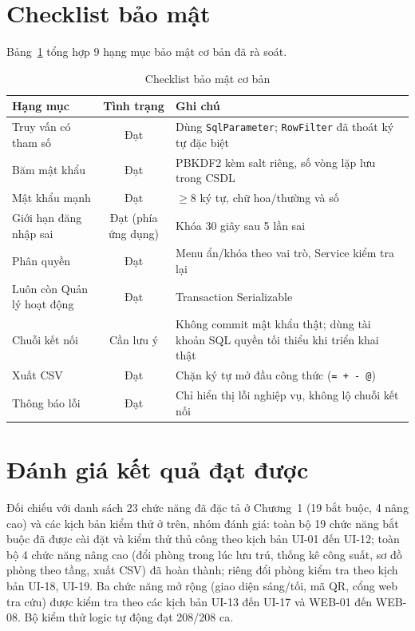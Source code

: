 \documentclass[14pt]{report}
\begin{document}
\section{Checklist bảo mật}

Bảng~\ref{tab:bmbd} tổng hợp 9 hạng mục bảo mật cơ bản đã rà soát.

\begin{table}[H]
\centering
\caption{Checklist bảo mật cơ bản}
\label{tab:bmbd}
\begin{tabularx}{\textwidth}{|X|c|X|}
\hline
\textbf{Hạng mục} & \textbf{Tình trạng} & \textbf{Ghi chú} \\\hline
Truy vấn có tham số & Đạt & Dùng \texttt{SqlParameter}; \texttt{RowFilter} đã thoát ký tự đặc biệt \\\hline
Băm mật khẩu & Đạt & PBKDF2 kèm salt riêng, số vòng lặp lưu trong CSDL \\\hline
Mật khẩu mạnh & Đạt & $\ge 8$ ký tự, chữ hoa/thường và số \\\hline
Giới hạn đăng nhập sai & Đạt (phía ứng dụng) & Khóa 30 giây sau 5 lần sai \\\hline
Phân quyền & Đạt & Menu ẩn/khóa theo vai trò, Service kiểm tra lại \\\hline
Luôn còn Quản lý hoạt động & Đạt & Transaction Serializable \\\hline
Chuỗi kết nối & Cần lưu ý & Không commit mật khẩu thật; dùng tài khoản SQL quyền tối thiểu khi triển khai thật \\\hline
Xuất CSV & Đạt & Chặn ký tự mở đầu công thức (\texttt{= + - @}) \\\hline
Thông báo lỗi & Đạt & Chỉ hiển thị lỗi nghiệp vụ, không lộ chuỗi kết nối \\\hline
\end{tabularx}
\end{table}

\section{Đánh giá kết quả đạt được}

Đối chiếu với danh sách 23 chức năng đã đặc tả ở Chương~1 (19 bắt buộc, 4 nâng cao) và các kịch bản kiểm thử ở trên, nhóm đánh giá: toàn bộ 19 chức năng bắt buộc đã được cài đặt và kiểm thử thủ công theo kịch bản UI-01 đến UI-12; toàn bộ 4 chức năng nâng cao (đổi phòng trong lúc lưu trú, thống kê công suất, sơ đồ phòng theo tầng, xuất CSV) đã hoàn thành; riêng đổi phòng kiểm tra theo kịch bản UI-18, UI-19. Ba chức năng mở rộng (giao diện sáng/tối, mã QR, cổng web tra cứu) được kiểm tra theo các kịch bản UI-13 đến UI-17 và WEB-01 đến WEB-08. Bộ kiểm thử logic tự động đạt 208/208 ca.
\end{document}
